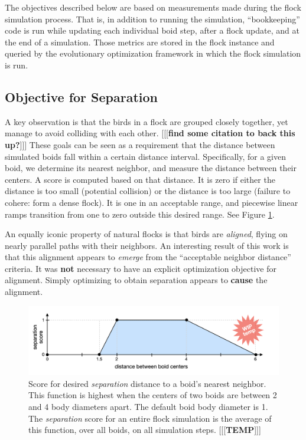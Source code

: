 \documentclass[letterpaper]{article}
\begin{document}
The objectives described below are based on measurements made during the flock simulation process. That is, in addition to running the simulation, ``bookkeeping'' code is run while updating each individual boid step, after a flock update, and at the end of a simulation. Those metrics are stored in the flock instance and queried by the evolutionary optimization framework in which the flock simulation is run.

\subsection{Objective for Separation}
\label{subsec:separation_objective}

A key observation is that the birds in a flock are grouped closely together, yet manage to avoid colliding with each other. [[[\textbf{find some citation to back this up?}]]] These goals can be seen as a requirement that the distance between simulated boids fall within a certain distance interval. Specifically, for a given boid, we determine its nearest neighbor, and measure the distance between their centers. A score is computed based on that distance. It is zero if either the distance is too small (potential collision) or the distance is too large (failure to cohere: form a dense flock). It is one in an acceptable range, and piecewise linear ramps transition from one to zero outside this desired range. See Figure \ref{fig:SeparationScore}.

An equally iconic property of natural flocks is that birds are \textit{aligned}, flying on nearly parallel paths with their neighbors. An interesting result of this work is that this alignment appears to \textit{emerge} from the ``acceptable neighbor distance'' criteria. It was \textbf{not} necessary to have an explicit optimization objective for alignment. Simply optimizing to obtain separation appears to \textbf{cause} the alignment.


\begin{figure}[t]
    \centering
    \includegraphics[width=0.9\linewidth]{images/temp_sep_score.png}
    \caption{Score for desired \textit{separation} distance to a boid's nearest neighbor. This function is highest when the centers of two boids are between 2 and 4 body diameters apart. The default boid body diameter is 1. The \textit{separation} score for an entire flock simulation is the average of this function, over all boids, on all simulation steps. [[[\textbf{TEMP}]]]}
    \label{fig:SeparationScore}
\end{figure}
\end{document}
